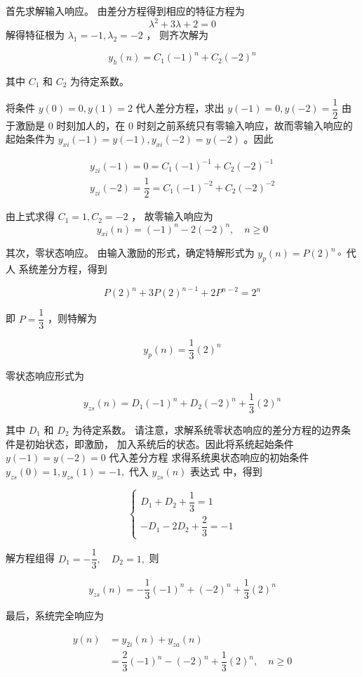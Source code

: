 \documentclass[cn,11pt,chinese,black,simple]{../elegantbook}
\begin{document}
\begin{solution}
    
首先求解输入响应。
由差分方程得到相应的特征方程为
\[
\lambda^{2}+3 \lambda+2=0
\]
解得特征根为 \(\lambda_{1}=-1, \lambda_{2}=-2\) ， 则齐次解为

\[
y_{h}(n)=C_{1}(-1)^{n}+C_{2}(-2)^{n}
\]

其中 \(C_{1}\) 和 \(C_{2}\) 为待定系数。

将条件 \(y(0)=0, y(1)=2\) 代人差分方程，求出 \(y(-1)=0, y(-2)=\dfrac{1}{2}\)
由于激励是 0 时刻加人的，在 0 时刻之前系统只有零输入响应，故而零输入响应的 起始条件为 \(y_{x i}(-1)=y(-1), y_{x i}(-2)=y(-2) \) 。因此

\[
\begin{array}{l}
y_{ zi }(-1)=0=C_{1}(-1)^{-1}+C_{2}(-2)^{-1} \\
y_{ zi }(-2)=\dfrac{1}{2}=C_{1}(-1)^{-2}+C_{2}(-2)^{-2}
\end{array}
\]

由上式求得 \(C_{1}=1, C_{2}=-2 \) ， 故零输入响应为
\[
y_{x i}(n)=(-1)^{n}-2(-2)^{n}, \quad n \geq 0
\]

其次，零状态响应。
由输入激励的形式，确定特解形式为 \(y_{p}(n)=P(2)^{n} \circ\) 代人 系统差分方程，得到

\[
P(2)^{n}+3 P(2)^{n-1}+2 P^{n-2}=2^{n}
\]

即 \(P = \dfrac{1}{3}\) ，则特解为

\[
y_{p}(n)=\dfrac{1}{3}(2)^{n}
\]

零状态响应形式为

\[
y_{zs}(n)=D_{1}(-1)^{n}+D_{2}(-2)^{n}+\dfrac{1}{3}(2)^{n}
\]

其中 \(D_{1}\) 和 \(D_{2}\) 为待定系数。 请注意，求解系统零状态响应的差分方程的边界条件是初始状态，即激励，
加入系统后的状态。因此将系统起始条件 \(y(-1)=y(-2)=0\) 代入差分方程
求得系统奥状态响应的初始条件 \(y_{ zs }(0)=1, y_{ zs }(1)=-1,\) 代入 \(y_{ zs }(n)\) 表达式
中，得到

\[
\left\{\begin{array}{l}
D_{1}+D_{2}+\dfrac{1}{3}=1 \\
-D_{1}-2 D_{2}+\dfrac{2}{3}=-1
\end{array}\right.
\]

解方程组得 \(D_{1}=-\dfrac{1}{3}, \quad D_{2}=1,\) 则

\[
y_{z s}(n)=-\dfrac{1}{3}(-1)^{n}+(-2)^{n}+\dfrac{1}{3}(2)^{n}
\]

最后，系统完全响应为

\[
\begin{aligned}
y(n) &=y_{2 i}(n)+y_{z a}(n) \\
&=\dfrac{2}{3}(-1)^{n}-(-2)^{n}+\dfrac{1}{3}(2)^{n}, \quad n \geq 0
\end{aligned}
\]

\end{solution}
\end{document}
